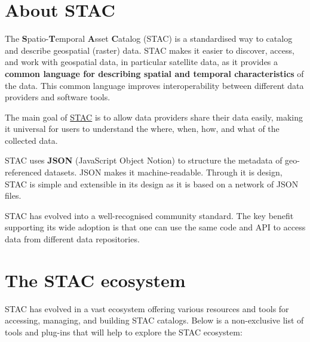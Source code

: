 \documentclass[
  letterpaper,
  DIV=11,
  numbers=noendperiod]{scrreprt}
\begin{document}
\section{About STAC}\label{about-stac}

The \textbf{S}patio-\textbf{T}emporal \textbf{A}sset \textbf{C}atalog
(STAC) is a standardised way to catalog and describe geospatial (raster)
data. STAC makes it easier to discover, access, and work with geospatial
data, in particular satellite data, as it provides a \textbf{common
language for describing spatial and temporal characteristics} of the
data. This common language improves interoperability between different
data providers and software tools.

The main goal of \href{https://stacspec.org/en/}{STAC} is to allow data
providers share their data easily, making it universal for users to
understand the where, when, how, and what of the collected data.

STAC uses \textbf{JSON} (JavaScript Object Notion) to structure the
metadata of geo-referenced datasets. JSON makes it machine-readable.
Through it is design, STAC is simple and extensible in its design as it
is based on a network of JSON files.

STAC has evolved into a well-recognised community standard. The key
benefit supporting its wide adoption is that one can use the same code
and API to access data from different data repositories.

\section{The STAC ecosystem}\label{the-stac-ecosystem}

STAC has evolved in a vast ecosystem offering various resources and
tools for accessing, managing, and building STAC catalogs. Below is a
non-exclusive list of tools and plug-ins that will help to explore the
STAC ecosystem:
\end{document}
